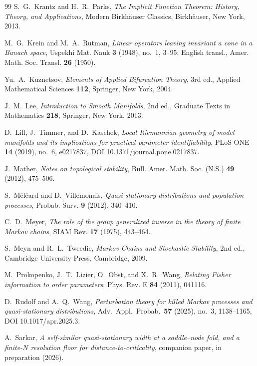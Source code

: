 \documentclass[11pt,reqno]{amsart}
\theoremstyle{plain}
\theoremstyle{definition}
\theoremstyle{remark}
\begin{document}
\begin{thebibliography}{99}
 S.~G.~Krantz and H.~R.~Parks, \emph{The Implicit
Function Theorem: History, Theory, and Applications}, Modern Birkh\"auser
Classics, Birkh\"auser, New York, 2013.

 M.~G.~Krein and M.~A.~Rutman, \emph{Linear operators
leaving invariant a cone in a Banach space}, Uspekhi Mat. Nauk \textbf{3} (1948),
no.~1, 3--95; English transl., Amer. Math. Soc. Transl. \textbf{26} (1950).

 Yu.~A.~Kuznetsov, \emph{Elements of Applied Bifurcation
Theory}, 3rd ed., Applied Mathematical Sciences \textbf{112}, Springer, New York,
2004.

 J.~M.~Lee, \emph{Introduction to Smooth Manifolds}, 2nd ed.,
Graduate Texts in Mathematics \textbf{218}, Springer, New York, 2013.

 D.~Lill, J.~Timmer, and D.~Kaschek, \emph{Local
Riemannian geometry of model manifolds and its implications for practical
parameter identifiability}, PLoS ONE \textbf{14} (2019), no.~6, e0217837,
DOI 10.1371/journal.pone.0217837.

 J.~Mather, \emph{Notes on topological stability}, Bull. Amer.
Math. Soc. (N.S.) \textbf{49} (2012), 475--506.

 S.~M\'el\'eard and D.~Villemonais,
\emph{Quasi-stationary distributions and population processes}, Probab. Surv.
\textbf{9} (2012), 340--410.

 C.~D.~Meyer, \emph{The role of the group generalized inverse in
the theory of finite Markov chains}, SIAM Rev. \textbf{17} (1975), 443--464.

 S.~Meyn and R.~L.~Tweedie, \emph{Markov Chains and
Stochastic Stability}, 2nd ed., Cambridge University Press, Cambridge, 2009.


 M.~Prokopenko, J.~T.~Lizier, O.~Obst, and X.~R.~Wang,
\emph{Relating Fisher information to order parameters}, Phys. Rev. E \textbf{84}
(2011), 041116.

 D.~Rudolf and A.~Q.~Wang, \emph{Perturbation theory for
killed Markov processes and quasi-stationary distributions}, Adv.\ Appl.\ Probab.\
\textbf{57} (2025), no.~3, 1138--1165, DOI 10.1017/apr.2025.3.

 A.~Sarkar, \emph{A self-similar quasi-stationary width at a
saddle--node fold, and a finite-$N$ resolution floor for distance-to-criticality},
companion paper, in preparation (2026).


\end{thebibliography}
\end{document}
